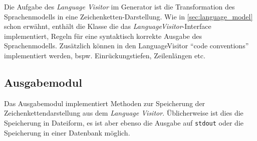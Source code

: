 Die Aufgabe des \emph{Language Visitor} im Generator ist die Transformation des Sprachenmodells in eine Zeichenketten-Darstellung. Wie in \cref{sec:language_model} schon erwähnt, enthält die Klasse die das \emph{LanguageVisitor}-Interface implementiert, Regeln für eine syntaktisch korrekte Ausgabe des Sprachenmodells. Zusätzlich können in den LanguageVisitor \enquote{code conventions} implementiert werden, bspw. Einrückungstiefen, Zeilenlängen etc.

\subsection{Ausgabemodul}
\label{sec:printer_module}

Das Ausgabemodul implementiert Methoden zur Speicherung der Zeichenkettendarstellung aus dem \emph{Language Visitor}. Üblicherweise ist dies die Speicherung in Dateiform, es ist aber ebenso die Ausgabe auf \texttt{stdout} oder die Speicherung in einer Datenbank möglich.